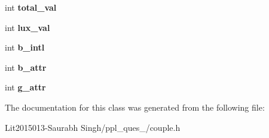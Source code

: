 \begin{DoxyCompactItemize}
int {\bfseries total\+\_\+val}
\item 
\mbox{\label{classcouple_acccc6fc5885997464ab7716eafa90331}} 
int {\bfseries lux\+\_\+val}
\item 
\mbox{\label{classcouple_ad5b5aadb8e89829fdc5a8e7921f29cba}} 
int {\bfseries b\+\_\+intl}
\item 
\mbox{\label{classcouple_a3d7d2ed58512c33ca7eacec507d958b1}} 
int {\bfseries b\+\_\+attr}
\item 
\mbox{\label{classcouple_a75407f4baf081f692829f4277106eaca}} 
int {\bfseries g\+\_\+attr}
\end{DoxyCompactItemize}


The documentation for this class was generated from the following file\+:\begin{DoxyCompactItemize}
\item 
Lit2015013-\/\+Saurabh Singh/ppl\+\_\+ques\+\_/couple.\+h\end{DoxyCompactItemize}
